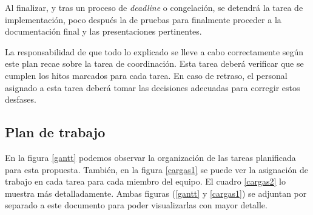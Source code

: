 \documentclass[a4paper,12pt,titlepage]{article}
\begin{document}
Al finalizar, y tras un proceso de \emph{deadline} o congelación, se detendrá
la tarea de implementación, poco después la de pruebas para finalmente
proceder a la documentación final y las presentaciones pertinentes.

La responsabilidad de que todo lo explicado se lleve a cabo correctamente
según este plan recae sobre la tarea de coordinación. Esta tarea deberá
verificar que se cumplen los hitos marcados para cada tarea. En caso de
retraso, el personal asignado a esta tarea deberá tomar las decisiones
adecuadas para corregir estos desfases.

\subsection{Plan de trabajo}

En la figura \ref{gantt} podemos observar la organización de las tareas
planificada para esta propuesta. También, en la figura \ref{cargas1} se puede
ver la asignación de trabajo en cada tarea para cada miembro del equipo. El
cuadro \ref{cargas2} lo muestra más detalladamente. Ambas figuras (\ref{gantt}
y \ref{cargas1}) se adjuntan por separado a este documento para poder
visualizarlas con mayor detalle.
\end{document}
